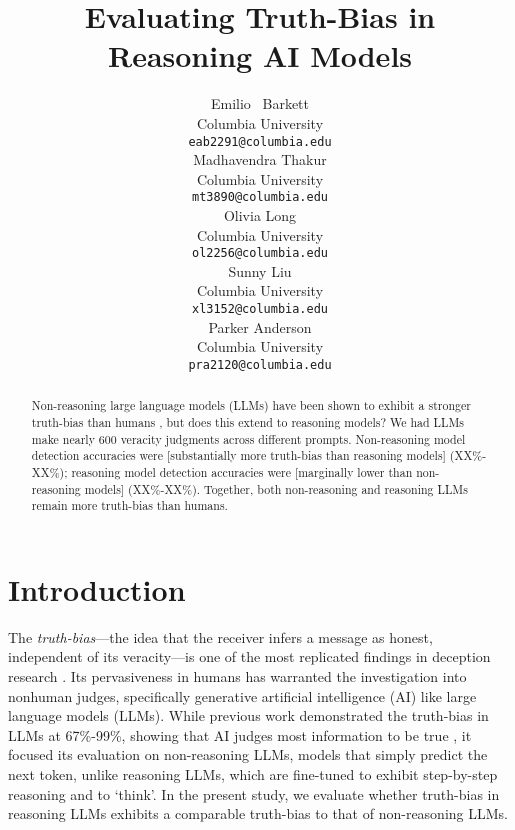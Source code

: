 \documentclass{article}
\title{Evaluating Truth-Bias in Reasoning AI Models}
\author{%
  Emilio ~Barkett\\
  Columbia University\\
  \texttt{eab2291@columbia.edu} \\
   \And
   Madhavendra Thakur \\
   Columbia University \\
   \texttt{mt3890@columbia.edu} \\
   \AND
   Olivia Long \\
   Columbia University \\
   \texttt{ol2256@columbia.edu} \\
   \And
   Sunny Liu\\
   Columbia University \\
   \texttt{xl3152@columbia.edu} \\
   \And
   Parker Anderson \\
   Columbia University \\
   \texttt{pra2120@columbia.edu} \\
}
\begin{document}
\maketitle


\begin{abstract}
  Non-reasoning large language models (LLMs) have been shown to exhibit a stronger truth-bias than humans \citep{markowitz_generative_2024}, but does this extend to reasoning models? We had LLMs make nearly 600 veracity judgments across different prompts. Non-reasoning model detection accuracies were [substantially more truth-bias than reasoning models] (XX\%-XX\%); reasoning model detection accuracies were [marginally lower than non-reasoning models] (XX\%-XX\%). Together, both non-reasoning and reasoning LLMs remain more truth-bias than humans.
\end{abstract}

\section{Introduction}


The \textit{truth-bias}---the idea that the receiver infers a message as honest, independent of its veracity---is one of the most replicated findings in deception research \citep{levine_duped_2020, levine_truth-default_2014}. Its pervasiveness in humans has warranted the investigation into nonhuman judges, specifically generative artificial intelligence (AI) like large language models (LLMs). While previous work demonstrated the truth-bias in LLMs at 67\%-99\%, showing that AI judges most information to be true \citep{markowitz_generative_2024}, it focused its evaluation on non-reasoning LLMs, models that simply predict the next token, unlike reasoning LLMs, which are fine-tuned to exhibit step-by-step reasoning and to `think'. In the present study, we evaluate whether truth-bias in reasoning LLMs exhibits a comparable truth-bias to that of non-reasoning LLMs.
\end{document}
